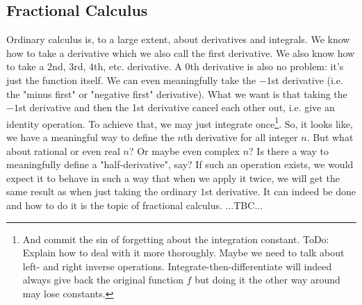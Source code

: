 



\subsection{Fractional Calculus}
Ordinary calculus is, to a large extent, about derivatives and integrals. We know how to take a derivative which we also call the first derivative. We also know how to take a 2nd, 3rd, 4th, etc. derivative. A 0th derivative is also no problem: it's just the function itself. We can even meaningfully take the $-1$st derivative (i.e. the "minus first" or "negative first" derivative). What we want is that taking the $-1$st derivative and then the 1st derivative cancel each other out, i.e. give an identity operation. To achieve that, we may just integrate once\footnote{And commit the sin of forgetting about the integration constant. ToDo: Explain how to deal with it more thoroughly. Maybe we need to talk about left- and right inverse operations. Integrate-then-differentiate will indeed always give back the original function $f$ but doing it the other way around may lose constants.}. So, it looks like, we have a meaningful way to define the $n$th derivative for all integer $n$. But what about rational or even real $n$? Or maybe even complex $n$? Is there a way to meaningfully define a "half-derivative", say? If such an operation exists, we would expect it to behave in such a way that when we apply it twice, we will get the same result as when just taking the ordinary $1$st derivative. It can indeed be done and how to do it is the topic of fractional calculus. ...TBC...





